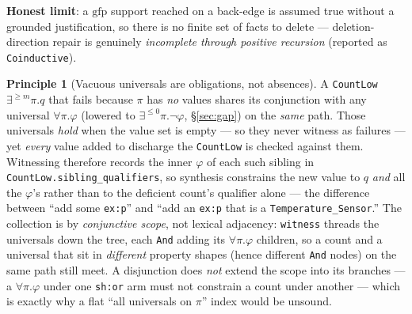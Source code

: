 \documentclass[11pt]{article}
\newcommand{\gfp}{\mathrm{gfp}}
\newcommand{\code}[1]{\texttt{#1}}
\theoremstyle{definition}
\newtheorem{principle}{Principle}[section]
\begin{document}
\textbf{Honest limit}: a $\gfp$ support reached on a back-edge is assumed true
without a grounded justification, so there is no finite set of facts to delete ---
deletion-direction repair is genuinely \emph{incomplete through positive
recursion} (reported as \code{Coinductive}).

\begin{principle}[Vacuous universals are obligations, not absences]
A \code{CountLow}\,$\exists^{\geq m}\pi.q$ that fails because $\pi$ has \emph{no}
values shares its conjunction with any universal $\forall\pi.\varphi$
(lowered to $\exists^{\leq0}\pi.\neg\varphi$, \S\ref{sec:gap}) on the
\emph{same} path. Those universals \emph{hold} when the value set is empty --- so
they never witness as failures --- yet \emph{every} value added to discharge the
\code{CountLow} is checked against them. Witnessing therefore records the inner
$\varphi$ of each such sibling in \code{CountLow.sibling\_qualifiers}, so synthesis
constrains the new value to $q$ \emph{and} all the $\varphi$'s rather than to the
deficient count's qualifier alone --- the difference between ``add some
\code{ex:p}'' and ``add an \code{ex:p} that is a \code{Temperature\_Sensor}.''
The collection is by \emph{conjunctive scope}, not lexical adjacency: \code{witness}
threads the universals down the tree, each \code{And} adding its $\forall\pi.\varphi$
children, so a count and a universal that sit in \emph{different} property shapes
(hence different \code{And} nodes) on the same path still meet. A disjunction does
\emph{not} extend the scope into its branches --- a $\forall\pi.\varphi$ under one
\code{sh:or} arm must not constrain a count under another --- which is exactly why
a flat ``all universals on $\pi$'' index would be unsound.
\end{principle}
\end{document}
